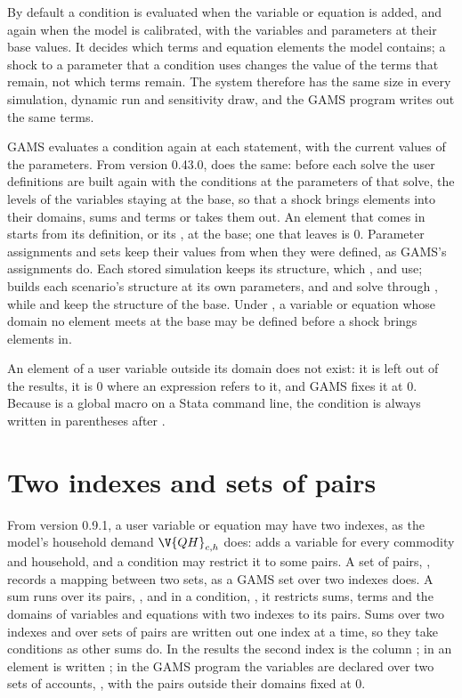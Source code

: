By default a condition is evaluated when the variable or equation is added,
and again when the model is calibrated, with the variables and parameters at
their base values. It decides which terms and equation elements the model
contains; a shock to a parameter that a condition uses changes the value of
the terms that remain, not which terms remain. The system therefore has the
same size in every simulation, dynamic run and sensitivity draw, and the GAMS
program writes out the same terms.

GAMS evaluates a condition again at each  statement, with the
current values of the parameters. From version 0.43.0,  does the same: before each solve the user definitions are
built again with the conditions at the parameters of that solve, the levels
of the variables staying at the base, so that a shock brings elements into
their domains, sums and terms or takes them out. An element that comes in
starts from its definition, or its , at the base; one that leaves
is 0. Parameter assignments and sets keep their values from when they were
defined, as GAMS's assignments do. Each stored simulation keeps its
structure, which ,  and
 use;  builds each scenario's structure at
its own parameters, and  and  solve
through , while  and
 keep the structure of the base. Under , a
variable or equation whose domain no element meets at the base may be
defined before a shock brings elements in.

An element of a user variable outside its domain does not exist: it is left
out of the results, it is 0 where an expression refers to it, and GAMS fixes
it at 0. Because \cmd{$} is a global macro on a Stata command
line, the condition is always written in parentheses after \cmd{$}.

\section{Two indexes and sets of pairs}\label{sec:userpairs}

From version 0.9.1, a user variable or equation may have two indexes, as the
model's household demand $\V{QH}_{c,h}$ does:  adds a variable for every commodity and household, and a
condition may restrict it to some pairs. A set of pairs, , records a mapping between two sets, as a
GAMS set over two indexes does. A sum runs over its pairs,
, and in a condition, , it
restricts sums, terms and the domains of variables and equations with two
indexes to its pairs. Sums over two indexes and over sets of pairs are written
out one index at a time, so they take conditions as other sums do. In the
results the second index is the column ; in 
an element is written ; in the GAMS program the variables are
declared over two sets of accounts, , with the pairs outside
their domains fixed at 0.

